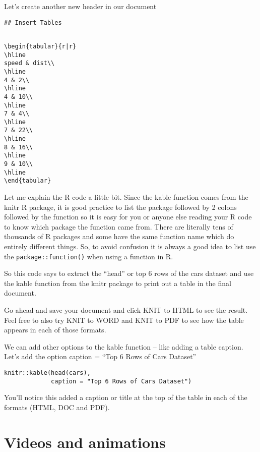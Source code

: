 \documentclass[]{book}
\theoremstyle{definition}
\theoremstyle{definition}
\theoremstyle{definition}
\theoremstyle{remark}
\begin{document}
Let's create another new header in our document

\texttt{\#\#\ Insert\ Tables}

\begin{verbatim}

\begin{tabular}{r|r}
\hline
speed & dist\\
\hline
4 & 2\\
\hline
4 & 10\\
\hline
7 & 4\\
\hline
7 & 22\\
\hline
8 & 16\\
\hline
9 & 10\\
\hline
\end{tabular}
\end{verbatim}

Let me explain the R code a little bit. Since the kable function comes
from the knitr R package, it is good practice to list the package
followed by 2 colons followed by the function so it is easy for you or
anyone else reading your R code to know which package the function came
from. There are literally tens of thousands of R packages and some have
the same function name which do entirely different things. So, to avoid
confusion it is always a good idea to list use the
\texttt{package::function()} when using a function in R.

So this code says to extract the ``head'' or top 6 rows of the cars
dataset and use the kable function from the knitr package to print out a
table in the final document.

Go ahead and save your document and click KNIT to HTML to see the
result. Feel free to also try KNIT to WORD and KNIT to PDF to see how
the table appears in each of those formats.

We can add other options to the kable function -- like adding a table
caption. Let's add the option caption = ``Top 6 Rows of Cars Dataset''

\begin{verbatim}
knitr::kable(head(cars),
             caption = "Top 6 Rows of Cars Dataset")
\end{verbatim}

You'll notice this added a caption or title at the top of the table in
each of the formats (HTML, DOC and PDF).

\section{Videos and animations}\label{videos-and-animations}
\end{document}
